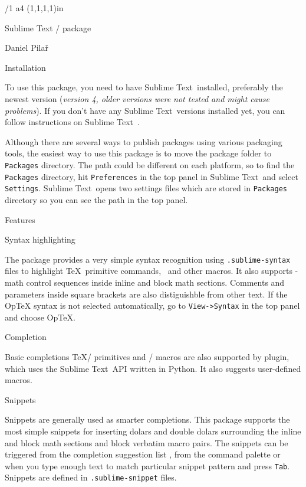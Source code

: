 \fontfam[Termes]

\typosize[11/13]
\margins/1 a4 (1,1,1,1)in
\enlang
\nopagenumbers

\hyperlinks \Blue \Blue


\def\subl{Sublime Text}


\tit Sublime Text \OpTeX/ package

\hfil Daniel Pilař \hfil\par
\medskip
\hfil \the\year \hfil


\nonum\sec Installation

To use this package, you need to have \subl\ installed, preferably the newest version
({\it version 4, older versions were not tested and might cause problems}). If you don't have any \subl\ versions installed yet,
you can follow instructions on \subl\ .  \par

Although there are several ways to publish packages using various packaging tools, the easiest way to use this package is to
move the package folder to {\tt Packages} directory. The path could be different on each platform, so to find the {\tt Packages} directory,
hit {\tt Preferences} in the top panel in \subl\ and select {\tt Settings}. \subl\ opens two settings files which are stored in {\tt Packages}
directory so you can see the path in the top panel.

\nonum\sec Features

\nonum\secc Syntax highlighting

The package provides a very simple syntax recognition using {\tt .sublime-syntax} files to highlight \TeX\ primitive commands, \OpTeX\ and
other macros. It also supports \OpTeX-math control sequences inside inline and block math sections. Comments and parameters inside square
brackets are also distiguishble from other text. If the OpTeX syntax is not selected automatically, go to {\tt View->Syntax} in the top panel
and choose OpTeX.

\nonum\secc Completion

Basic completions \TeX/ primitives and \OpTeX/ macros are also supported by plugin, which uses the \subl\ API written in Python. It also suggests
user-defined macros.

\nonum\secc Snippets

Snippets are generally used as smarter completions. This package supports the most simple snippets for inserting dolars and double dolars
surrounding the inline and block math sections and block verbatim macro pairs. The snippets can be triggered from the completion suggestion list
, from the command palette or when you type enough text to match particular snippet pattern and press {\tt Tab}. Snippets are defined in
{\tt .sublime-snippet} files.

